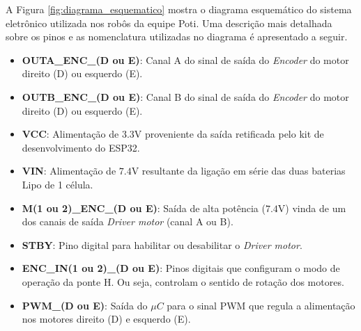 A Figura \ref{fig:diagrama_esquematico} mostra o diagrama esquemático do sistema eletrônico utilizada nos robôs da equipe Poti. Uma descrição mais detalhada sobre os pinos e as nomenclatura utilizadas no diagrama é apresentado a seguir. 

\begin{itemize}
    \item \textbf{OUTA\_ENC\_(D ou E)}: Canal A do sinal de saída do \emph{Encoder} do motor direito (D) ou esquerdo (E).
    \item \textbf{OUTB\_ENC\_(D ou E)}: Canal B do sinal de saída do \emph{Encoder} do motor direito (D) ou esquerdo (E).
    \item \textbf{VCC}: Alimentação de $3.3$V proveniente da saída retificada pelo kit de desenvolvimento do ESP32.
    \item \textbf{VIN}: Alimentação de $7.4$V resultante da ligação em série das duas baterias Lipo de 1 célula.
    \item \textbf{M(1 ou 2)\_ENC\_(D ou E)}: Saída de alta potência ($7.4$V) vinda de um dos canais de saída \emph{Driver motor} (canal A ou B).
    \item \textbf{STBY}: Pino digital para habilitar ou desabilitar o \emph{Driver motor}.
    \item \textbf{ENC\_IN(1 ou 2)\_(D ou E)}: Pinos digitais que configuram o modo de operação da ponte H. Ou seja, controlam o sentido de rotação dos motores.
    \item \textbf{PWM\_(D ou E)}: Saída do $\mu{}C$ para o sinal PWM que regula a alimentação nos motores direito (D) e esquerdo (E).
\end{itemize}

